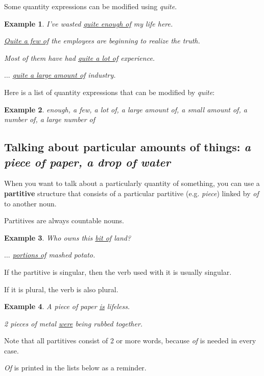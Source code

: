 \documentclass[oneside]{book}
\numberwithin{equation}{section}
\newtheorem{example}{Example}[section]
\begin{document}
%
\noindent{} Some quantity expressions can be modified using \textit{quite}.
\begin{example}
    I've wasted \underline{quite enough of} my life here.
    
    \underline{Quite a few of} the employees are beginning to realize the truth.
    
    Most of them have had \underline{quite a lot of} experience.
    
    $\ldots$ \underline{quite a large amount of} industry.
\end{example}
Here is a list of quantity expressions that can be modified by \textit{quite}:
\begin{example}
    enough, a few, a lot of, a large amount of, a small amount of, a number of, a large number of
\end{example}

\subsection{Talking about particular amounts of things: \textit{a piece of paper, a drop of water}}
\noindent{} When you want to talk about a particularly quantity of something, you can use a \textbf{partitive} structure that consists of a particular partitive (e.g. \textit{piece}) linked by \textit{of} to another noun.

Partitives are always countable nouns.
\begin{example}
    Who owns this \underline{bit of} land?
    
    $\ldots$ \underline{portions of} mashed potato.
\end{example}
If the partitive is singular, then the verb used with it is usually singular.

If it is plural, the verb is also plural.
\begin{example}
    A piece of paper \underline{is} lifeless.
    
    2 pieces of metal \underline{were} being rubbed together.
\end{example}
Note that all partitives consist of 2 or more words, because \textit{of} is needed in every case.

\textit{Of} is printed in the lists below as a reminder.
\end{document}
